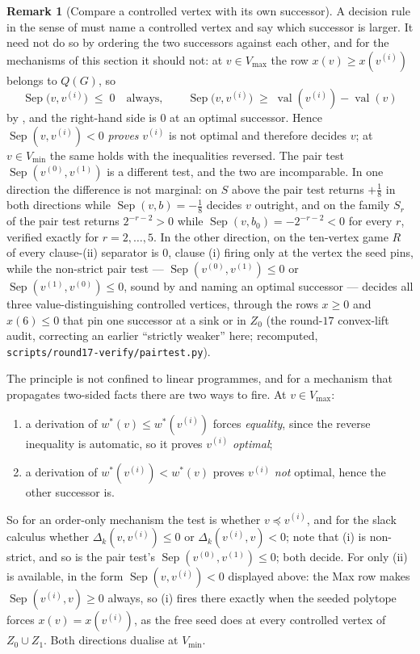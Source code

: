 \documentclass[11pt]{article}
\theoremstyle{plain}
\theoremstyle{definition}
\newtheorem{remark}[theorem]{Remark}
\DeclareMathOperator{\val}{val}
\newcommand{\Vmax}{V_{\max}}
\newcommand{\Vmin}{V_{\min}}
\begin{document}
\begin{remark}[Compare a controlled vertex with its own successor]\label{rem:own-successor}
A decision rule in the sense of  must name a controlled
vertex and say which successor is larger. It need not do so by ordering the two
successors against each other, and for the mechanisms of this section it should
not: at $v\in\Vmax$ the row $x(v)\ge x(v^{(i)})$ belongs to $Q(G)$, so
\[
  \operatorname{Sep}\bigl(v,v^{(i)}\bigr)\;\le\;0\quad\text{always},\qquad
  \operatorname{Sep}\bigl(v,v^{(i)}\bigr)\;\ge\;\val(v^{(i)})-\val(v)
\]
by , and the right-hand side is $0$ at an optimal
successor. Hence $\operatorname{Sep}(v,v^{(i)})<0$ \emph{proves} $v^{(i)}$ is
not optimal and therefore decides $v$; at $v\in\Vmin$ the same holds with the
inequalities reversed. The pair test $\operatorname{Sep}(v^{(0)},v^{(1)})$ is
a different test, and the two are incomparable. In one direction the
difference is not marginal: on $S$ above the pair test
returns $+\tfrac18$ in both directions while $\operatorname{Sep}(v,b)=-\tfrac18$
decides $v$ outright, and on the family $S_r$ of 
the pair test returns $2^{-r-2}>0$ while $\operatorname{Sep}(v,b_0)=-2^{-r-2}<0$
for every $r$, verified exactly for $r=2,\dots,5$. In the other direction, on
the ten-vertex game $R$ of  every clause-(ii)
separator is $0$, clause (i) firing only at the vertex the seed pins, while the non-strict pair test ---
$\operatorname{Sep}(v^{(0)},v^{(1)})\le0$ or
$\operatorname{Sep}(v^{(1)},v^{(0)})\le0$, sound by 
and naming an optimal successor --- decides all three value-distinguishing
controlled vertices, through the rows $x\ge0$ and $x(6)\le0$ that pin one
successor at a sink or in $Z_0$ (the round-$17$ convex-lift audit,
correcting an earlier ``strictly weaker'' here; recomputed,
\texttt{scripts/round17-verify/pairtest.py}).

The principle is not confined to linear programmes, and for a mechanism that
propagates two-sided facts there are two ways to fire. At $v\in\Vmax$:
\begin{enumerate}[label=(\roman*),leftmargin=2.4em]
\item a derivation of $w^\ast(v)\le w^\ast(v^{(i)})$ forces \emph{equality},
      since the reverse inequality is automatic, so it proves $v^{(i)}$
      \emph{optimal};
\item a derivation of $w^\ast(v^{(i)})<w^\ast(v)$ proves $v^{(i)}$ \emph{not}
      optimal, hence the other successor is.
\end{enumerate}
So for an order-only mechanism the test is whether $v\preceq v^{(i)}$, and for
the slack calculus whether $\Delta_k(v,v^{(i)})\le0$ or
$\Delta_k(v^{(i)},v)<0$; note that (i) is non-strict, and so is the pair test's
$\operatorname{Sep}(v^{(0)},v^{(1)})\le0$; both decide. For  only (ii) is
available, in the form $\operatorname{Sep}(v,v^{(i)})<0$ displayed above: the
Max row makes $\operatorname{Sep}(v^{(i)},v)\ge0$ always, so (i) fires there
exactly when the seeded polytope forces $x(v)=x(v^{(i)})$, as the free seed
does at every controlled vertex of $Z_0\cup Z_1$. Both directions dualise at $\Vmin$.


\end{remark}
\end{document}
